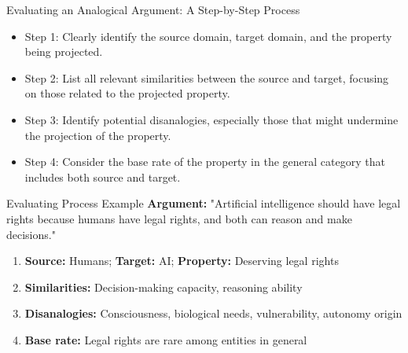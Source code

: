 \documentclass{beamer}
\begin{document}
	\begin{frame}{Evaluating an Analogical Argument: A Step-by-Step Process}
		\begin{itemize}
			\item Step 1: Clearly identify the source domain, target domain, and the property being projected.
			\item Step 2: List all relevant similarities between the source and target, focusing on those related to the projected property.
			\item Step 3: Identify potential disanalogies, especially those that might undermine the projection of the property.
			\item Step 4: Consider the base rate of the property in the general category that includes both source and target.
		\end{itemize}
		
		\begin{exampleblock}{Evaluating Process Example}
			\scriptsize
			\textbf{Argument:} "Artificial intelligence should have legal rights because humans have legal rights, and both can reason and make decisions."
			\begin{enumerate}
				\item \textbf{Source:} Humans; \textbf{Target:} AI; \textbf{Property:} Deserving legal rights
				\item \textbf{Similarities:} Decision-making capacity, reasoning ability
				\item \textbf{Disanalogies:} Consciousness, biological needs, vulnerability, autonomy origin
				\item \textbf{Base rate:} Legal rights are rare among entities in general
			\end{enumerate}
		\end{exampleblock}
	\end{frame}
	
\end{document}
